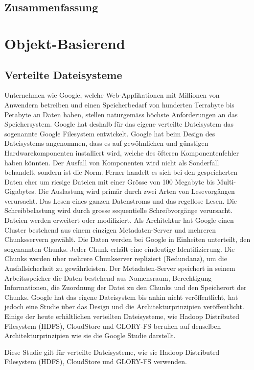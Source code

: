 \subsection{Zusammenfassung}


\section{Objekt-Basierend}

\subsection{Verteilte Dateisysteme}
Unternehmen wie Google, welche Web-Applikationen mit Millionen von Anwendern betreiben und einen Speicherbedarf von hunderten Terrabyte bis Petabyte an Daten haben, stellen naturgemäss höchste Anforderungen an das Speichersystem. Google hat deshalb für das eigene verteilte Dateisystem das sogenannte Google Filesystem entwickelt. Google hat beim Design des Dateisystems angenommen, dass es auf gewöhnlichen und günstigen Hardwarekomponenten installiert wird, welche des öfteren Komponentenfehler haben könnten. Der Ausfall von Komponenten wird nicht als Sonderfall behandelt, sondern ist die Norm. Ferner handelt es sich bei den gespeicherten Daten eher um riesige Dateien mit einer Grösse von 100 Megabyte bis Multi-Gigabytes. Die Auslastung wird primär durch zwei Arten von Lesevorgängen verursacht. Das Lesen eines ganzen Datenstroms und das regellose Lesen. Die Schreibbelastung wird durch grosse sequentielle Schreibvorgänge verursacht. Dateien werden erweitert oder modifiziert. Als Architektur hat Google einen Cluster bestehend aus einem einzigen Metadaten-Server und mehreren Chunksservern gewählt. Die Daten werden bei Google in Einheiten unterteilt, den sogenannten Chunks. Jeder Chunk erhält eine eindeutige Identifizierung. Die Chunks werden über mehrere Chunkserver repliziert (Redundanz), um die Ausfallsicherheit zu gewährleisten. Der Metadaten-Server speichert in seinem Arbeitsspeicher die Daten bestehend aus Namensraum, Berechtigung Informationen, die Zuordnung der Datei zu den Chunks und den Speicherort der Chunks. Google hat das eigene Dateisystem bis anhin nicht veröffentlicht, hat jedoch eine  Studie über das Design und die Architekturprinzipien veröffentlicht. Einige der heute erhältlichen verteilten Dateisysteme, wie Hadoop Distributed Filesystem (HDFS), CloudStore und GLORY-FS beruhen auf denselben Architekturprinzipien wie sie die Google Studie darstellt.


Diese Studie gilt für verteilte Dateisysteme, wie sie Hadoop Distributed Filesystem (HDFS), CloudStore und GLORY-FS verwenden.
 
